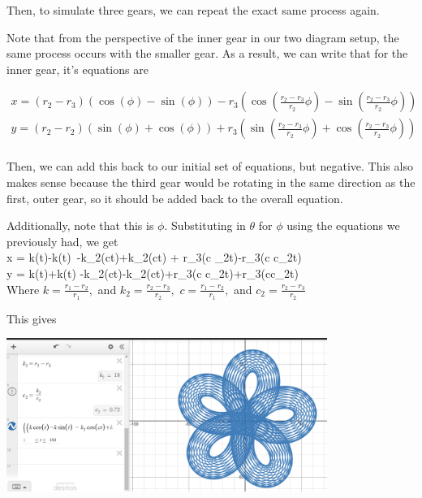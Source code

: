 \documentclass{article}
\theoremstyle{remark}
\theoremstyle{problem}
\numberwithin{problem}{subsection}
\numberwithin{Problem}{section}
\theoremstyle{definition}
\theoremstyle{definition}
\begin{document}
Then, to simulate three gears, we can repeat the exact same process again. 

Note that from the perspective of the inner gear in our two diagram setup, the same process occurs with the smaller gear. As a result, we can write that for the inner gear, it's equations are 

\begin{align*}
    x = (r_2 - r_3) (\cos(\phi) - \sin(\phi)) - r_3  \left( \cos\left(\frac{r_2 - r_3}{r_2}  \phi \right) - \sin\left(\frac{r_2 - r_3}{r_2}  \phi \right) \right) \\
    y = (r_2 - r_2) \left(\sin(\phi) + \cos(\phi) \right) + r_3 \left(\sin\left(\frac{r_2 - r_3}{r_2}  \phi \right) + \cos\left(\frac{r_2 - r_3}{r_2}  \phi \right) \right) \\
\end{align*}

Then, we can add this back to our initial set of equations, but negative. This also makes sense because the third gear would be rotating in the same direction as the first, outer gear, so it should be added back to the overall equation. 

Additionally, note that this is $\phi.$ Substituting in $\theta$ for $\phi$ using the equations we previously had, we get \\

x = k\cos\left(t\right)-k\sin\left(t\right)\ -k_{2}\cos\left(ct\right)+k_{2}\sin\left(ct\right) + r_{3}\cos\left(c \cdotc_{2}t\right)-r_{3}\sin\left(c \cdot c_{2}t\right) \\


y = k\sin\left(t\right)+k\cos\left(t\right) -k_{2}\sin\left(ct\right)-k_{2}\cos\left(ct\right)+r_{3}\sin\left(c \cdot c_{2}t\right)+r_{3}\cos\left(c\cdot c_{2}t\right) \\

Where $k = \frac{r_1 - r_2}{r_1},$ and $k_2 = \frac{r_2 - r_3}{r_2},$ $c = \frac{r_1 - r_2}{r_1},$ and $c_2 = \frac{r_2 - r_3}{r_2}$

This gives

\begin{center}
\includegraphics[height=5cm]{images/3-Gear Spiro.png}
\end{center}
\end{document}
